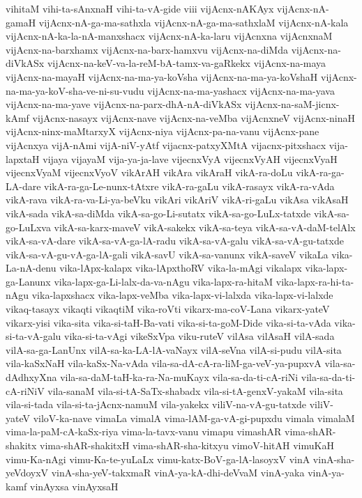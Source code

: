 {vihitaM
vihi-ta-sAnxnaH
vihi-ta-vA-gide
viii
vijAcnx-nAKAyx
vijAcnx-nA-gamaH
vijAcnx-nA-ga-ma-sathxla
vijAcnx-nA-ga-ma-sathxlaM
vijAcnx-nA-kala
vijAcnx-nA-ka-la-nA-manxshacx
vijAcnx-nA-ka-laru
vijAcnxna
vijAcnxnaM
vijAcnx-na-barxhamx
vijAcnx-na-barx-hamxvu
vijAcnx-na-diMda
vijAcnx-na-diVkASx
vijAcnx-na-keV-va-la-reM-bA-tamx-va-gaRkekx
vijAcnx-na-maya
vijAcnx-na-mayaH
vijAcnx-na-ma-ya-koVsha
vijAcnx-na-ma-ya-koVshaH
vijAcnx-na-ma-ya-koV-sha-ve-ni-su-vudu
vijAcnx-na-ma-yashacx
vijAcnx-na-ma-yava
vijAcnx-na-ma-yave
vijAcnx-na-parx-dhA-nA-diVkASx
vijAcnx-na-saM-jicnx-kAmf
vijAcnx-nasayx
vijAcnx-nave
vijAcnx-na-veMba
vijAcnxneV
vijAcnx-ninaH
vijAcnx-ninx-maMtarxyX
vijAcnx-niya
vijAcnx-pa-na-vanu
vijAcnx-pane
vijAcnxya
vijA-nAmi
vijA-niV-yAtf
vijacnx-patxyXMtA
vijacnx-pitxshacx
vija-lapxtaH
vijaya
vijayaM
vija-ya-ja-lave
vijecnxVyA
vijecnxVyAH
vijecnxVyaH
vijecnxVyaM
vijecnxVyoV
vikArAH
vikAra
vikAraH
vikA-ra-doLu
vikA-ra-ga-LA-dare
vikA-ra-ga-Le-nunx-tAtxre
vikA-ra-gaLu
vikA-rasayx
vikA-ra-vAda
vikA-rava
vikA-ra-va-Li-ya-beVku
vikAri
vikAriV
vikA-ri-gaLu
vikAsa
vikAsaH
vikA-sada
vikA-sa-diMda
vikA-sa-go-Li-sutatx
vikA-sa-go-LuLx-tatxde
vikA-sa-go-LuLxva
vikA-sa-karx-maveV
vikA-sakekx
vikA-sa-teya
vikA-sa-vA-daM-telAlx
vikA-sa-vA-dare
vikA-sa-vA-ga-lA-radu
vikA-sa-vA-galu
vikA-sa-vA-gu-tatxde
vikA-sa-vA-gu-vA-ga-lA-gali
vikA-savU
vikA-sa-vanunx
vikA-saveV
vikaLa
vika-La-nA-denu
vika-lApx-kalapx
vika-lApxthoRV
vika-la-mAgi
vikalapx
vika-lapx-ga-Lanunx
vika-lapx-ga-Li-lalx-da-va-nAgu
vika-lapx-ra-hitaM
vika-lapx-ra-hi-ta-nAgu
vika-lapxshacx
vika-lapx-veMba
vika-lapx-vi-lalxda
vika-lapx-vi-lalxde
vikaq-tasayx
vikaqti
vikaqtiM
vika-roVti
vikarx-ma-coV-Lana
vikarx-yateV
vikarx-yisi
vika-sita
vika-si-taH-Ba-vati
vika-si-ta-goM-Dide
vika-si-ta-vAda
vika-si-ta-vA-galu
vika-si-ta-vAgi
vikeSxVpa
viku-ruteV
vilAsa
vilAsaH
vilA-sada
vilA-sa-ga-LanUnx
vilA-sa-ka-LA-lA-vaNayx
vilA-seVna
vilA-si-pudu
vilA-sita
vila-kaSxNaH
vila-kaSx-Na-vAda
vila-sa-dA-cA-ra-liM-ga-veV-ya-pupxvA
vila-sa-dAdhxyXna
vila-sa-daM-taH-ka-ra-Na-muKayx
vila-sa-da-ti-cA-riNi
vila-sa-da-ti-cA-riNiV
vila-sanaM
vila-si-tA-SaTx-shabadx
vila-si-tA-genxV-yakaM
vila-sita
vila-si-tada
vila-si-ta-jAcnx-namuM
vila-yakekx
viliV-na-vA-gu-tatxde
viliV-yateV
viloV-ka-nave
vimaLa
vimalA
vima-lAM-ga-vA-gi-pupxdu
vimala
vimalaM
vima-la-paM-cA-kaSx-riya
vima-la-tavx-vanu
vimapu
vimashAR
vima-shAR-shakitx
vima-shAR-shakitxH
vima-shAR-sha-kitxyu
vimoV-hitAH
vimuKaH
vimu-Ka-nAgi
vimu-Ka-te-yuLaLx
vimu-katx-BoV-ga-lA-lasoyxV
vinA
vinA-sha-yeVdoyxV
vinA-sha-yeV-takxmaR
vinA-ya-kA-dhi-deVvaM
vinA-yaka
vinA-ya-kamf
vinAyxsa
vinAyxsaH
}
